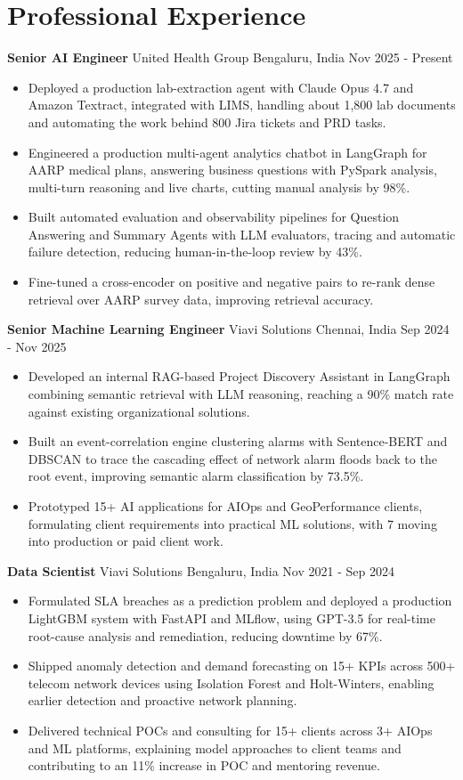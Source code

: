 \documentclass[10pt,a4paper]{article}
\newcommand{\role}[4]{\textbf{#1} \textbar{} #2 \hfill #3 \textbar{} #4\par}
\begin{document}
\section{Professional Experience}
\role{Senior AI Engineer}{United Health Group}{Bengaluru, India}{Nov 2025 - Present}
\begin{itemize}
  \item Deployed a production lab-extraction agent with Claude Opus 4.7 and Amazon Textract, integrated with LIMS, handling about 1,800 lab documents and automating the work behind 800 Jira tickets and PRD tasks.
  \item Engineered a production multi-agent analytics chatbot in LangGraph for AARP medical plans, answering business questions with PySpark analysis, multi-turn reasoning and live charts, cutting manual analysis by 98\%.
  \item Built automated evaluation and observability pipelines for Question Answering and Summary Agents with LLM evaluators, tracing and automatic failure detection, reducing human-in-the-loop review by 43\%.
  \item Fine-tuned a cross-encoder on positive and negative pairs to re-rank dense retrieval over AARP survey data, improving retrieval accuracy.
\end{itemize}
\vspace{3pt}
\role{Senior Machine Learning Engineer}{Viavi Solutions}{Chennai, India}{Sep 2024 - Nov 2025}
\begin{itemize}
  \item Developed an internal RAG-based Project Discovery Assistant in LangGraph combining semantic retrieval with LLM reasoning, reaching a 90\% match rate against existing organizational solutions.
  \item Built an event-correlation engine clustering alarms with Sentence-BERT and DBSCAN to trace the cascading effect of network alarm floods back to the root event, improving semantic alarm classification by 73.5\%.
  \item Prototyped 15+ AI applications for AIOps and GeoPerformance clients, formulating client requirements into practical ML solutions, with 7 moving into production or paid client work.
\end{itemize}
\vspace{3pt}
\role{Data Scientist}{Viavi Solutions}{Bengaluru, India}{Nov 2021 - Sep 2024}
\begin{itemize}
  \item Formulated SLA breaches as a prediction problem and deployed a production LightGBM system with FastAPI and MLflow, using GPT-3.5 for real-time root-cause analysis and remediation, reducing downtime by 67\%.
  \item Shipped anomaly detection and demand forecasting on 15+ KPIs across 500+ telecom network devices using Isolation Forest and Holt-Winters, enabling earlier detection and proactive network planning.
  \item Delivered technical POCs and consulting for 15+ clients across 3+ AIOps and ML platforms, explaining model approaches to client teams and contributing to an 11\% increase in POC and mentoring revenue.
\end{itemize}
\end{document}
